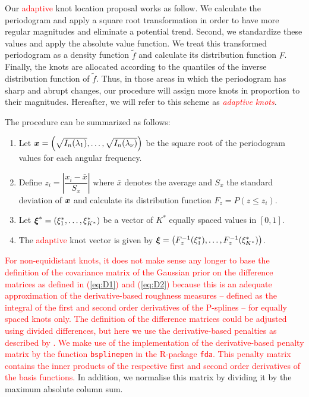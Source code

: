 \documentclass[twocolumn,final]{svjour3}
\newcommand{\bm}[1]{\mbox{\boldmath $#1$}}
\newcommand{\pmr}{ \color{blue}}
\begin{document}
Our \textcolor{red}{adaptive} knot location proposal works as follow.  We calculate the periodogram and apply a square root transformation in order to have more regular magnitudes and eliminate a potential trend.  Second, we standardize these values and apply the absolute value function.  We treat this transformed periodogram as a density function $\widetilde{f}$ and calculate its distribution function $F$.  Finally, the knots are allocated according to the quantiles of the inverse distribution function of $\widetilde{f}$.  Thus, in those areas in which the periodogram has sharp and abrupt changes, our procedure will assign more knots in proportion to their magnitudes. Hereafter, we will refer to this scheme as \textcolor{red}{\em adaptive knots}.%

The procedure can be summarized as follows:
\begin{enumerate}
	\item Let $\bm{x} = \left (\sqrt{I_n(\lambda_1)}, \dots, \sqrt{I_n(\lambda_{\nu})} \right)$ be the square root of the periodogram values for each angular frequency.
	\item Define $z_i = \left|\dfrac{x_i - \bar{x}}{S_x} \right|$ where $\bar{x}$ denotes the average and $S_x$ the standard deviation of ${\bm x}$ and calculate its distribution function $F_z = P(z \leq z_i)$.
	\item Let $\bm{\xi}^* = \left(\xi_1^*,\dots,\xi_{K^*}^* \right)$ be a vector of $K^*$ equally spaced values in $[0,1]$.
	\item The \textcolor{red}{adaptive} knot vector is given by $\bm{\xi} = \left(F_{z}^{-1}(\xi^*_1),\dots, F_{z}^{-1}(\xi^*_{K^*}) \right)$.
	
\end{enumerate}

\textcolor{red}{For non-equidistant knots, it does not make sense any longer to base the definition of the covariance matrix of the Gaussian prior  on the  difference matrices as defined in (\ref{eq:D1}) and (\ref{eq:D2}) because this is an adequate approximation of the derivative-based roughness measures -- defined as the integral of the first and second order derivatives of the P-splines -- 
for equally spaced knots only. The definition of the difference matrices could be adjusted using divided differences, but here we use the derivative-based penalties as described by \cite{WoodSimon2017Pwdb}. We make use of the implementation of the derivative-based penalty matrix  by the function {\tt bsplinepen} in the R-package {\tt fda}. This penalty matrix contains the inner products of the respective first and second order derivatives of the basis functions.} {\pmr In addition, we normalise this matrix by dividing it by the maximum absolute column sum.}
\end{document}
